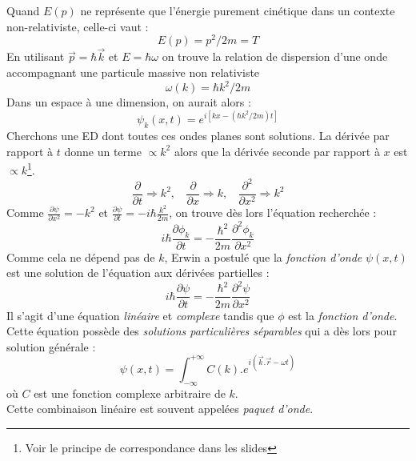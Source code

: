 \documentclass	[11pt, a4paper, openany]{book}
\begin{document}
Quand $E(p)$ ne représente que l'énergie purement cinétique dans un contexte non-relativiste, celle-ci vaut :
\begin{equation}
E(p) = p^2/2m=T
\end{equation}
En utilisant $\vec{p} = \hbar \vec{k}$ et $E = \hbar\omega$ on trouve la relation de dispersion d'une onde accompagnant une particule massive non relativiste
\begin{equation}
\omega (k) = \hbar k^2/2m
\end{equation}
Dans un espace à une dimension, on aurait alors : 
\begin{equation}
\psi_k(x,t) = e^{i[kx -(\hbar k^2/2m)t]}
\end{equation}
Cherchons une ED dont toutes ces ondes planes sont solutions. La dérivée par rapport à $t$ donne un terme $\propto k^2$ alors que la dérivée seconde par rapport à $x$ est $\propto k$\footnote{Voir le principe de correspondance dans les slides}.
\begin{equation}
\frac{\partial}{\partial t} \Rightarrow k^2,\ \ \ \ \frac{\partial}{\partial x} \Rightarrow k,\ \ \ \ \frac{\partial^2}{\partial x^2} \Rightarrow k^2
\end{equation}
Comme $\frac{\partial \psi}{\partial x^2}=-k^2$ et $\frac{\partial\psi}{\partial t}=-i\hbar\frac{k^2}{2m}$, on trouve dès lors l'équation recherchée :
\begin{equation}
i\hbar \frac{\partial \phi_k}{\partial t} = -\frac{\hbar^2}{2m}\frac{\partial^2 \phi_k}{\partial x^2}
\end{equation}
Comme cela ne dépend pas de $k$, Erwin a postulé que la \textit{fonction d'onde} $\psi (x,t)$ est une solution de l'équation aux dérivées partielles : 
\begin{equation}
i\hbar \frac{\partial \psi}{\partial t} = -\frac{\hbar^2}{2m}\frac{\partial^2 \psi}{\partial x^2}
\end{equation}
Il s'agit d'une équation \textit{linéaire} et \textit{complexe} tandis que $\phi$ est la \textit{fonction d'onde}.\\


Cette équation possède des \textit{solutions particulières séparables} qui a dès lors pour solution générale :
\begin{equation}
\psi (x,t) = \int_{-\infty}^{+\infty} C(k).e^{i(\vec{k}.\vec{r} - \omega t)}
\end{equation}
où $C$ est une fonction complexe arbitraire de $k$.\\
Cette combinaison linéaire est souvent appelées \textit{paquet d'onde}.\\
\end{document}
